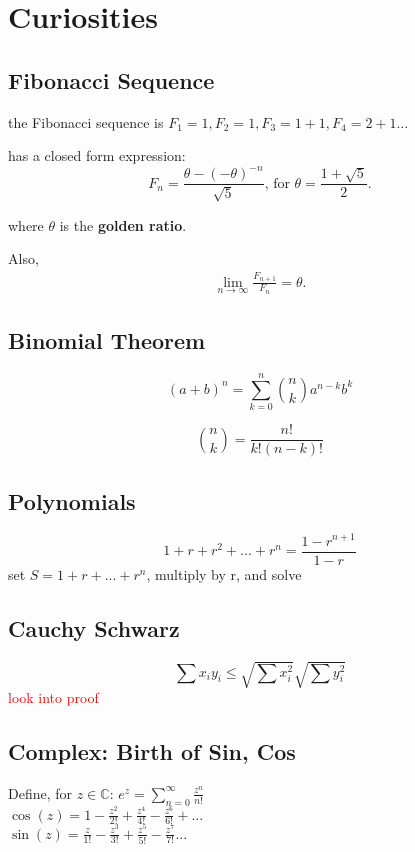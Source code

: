 \documentclass[a4paper, 12pt]{article}
\title{}
\date{}
\newcommand{\bt}[1]{\textbf{#1}} %
\newcommand{\eq}[1]{\begin{align*}#1\end{align*}} %
\renewcommand{\eq}[1]{\begin{align*}#1\end{align*}} %
\begin{document}
\section*{Curiosities}

\subsection*{Fibonacci Sequence}
the Fibonacci sequence is $F_1 = 1, F_2 = 1, F_3 = 1+1, F_4 = 2 + 1 \dots$

has a closed form expression:
$$F_n = \frac{\theta - (-\theta)^{-n}}{\sqrt{5}}
\text{, for $\theta = \frac{1 + \sqrt{5}}{2}$.}$$

where $\theta$ is the \bt{golden ratio}. 

Also, 
\eq{
    \lim_{n \rightarrow \infty} \frac{F_{n+1}}{F_n} = \theta.
}

\subsection*{Binomial Theorem}
$$(a+b)^n = \sum_{k=0}^n \binom{n}{k} a^{n-k}b^k$$

$$\binom{n}{k} = \frac{n!}{k!(n-k)!}$$

\subsection*{Polynomials}

$$1 + r + r^2 + ... + r^n = \frac{1 - r^{n+1}}{1-r}$$
\textcolor[gray]{0.5}{set $S = 1 + r + ... + r^n$, multiply by r, and solve}


\subsection*{Cauchy Schwarz}

$$\sum x_i y_i \leq \sqrt{\sum x_i^2} \sqrt{\sum y_i^2}$$
\textcolor{red}{look into proof}


\subsection*{Complex: Birth of Sin, Cos}
Define, for $z \in \mathbb{C}$: 
$\displaystyle e^z = \sum_{n=0}^\infty \frac{z^n}{n!}$\\
$\displaystyle \cos(z) = 1 - \frac{z^2}{2!} + \frac{z^4}{4!} - \frac{z^6}{6!} + ...$\\
$\displaystyle \sin(z) = \frac{z}{1!} - \frac{z^3}{3!} + \frac{z^5}{5!} - \frac{z^7}{7!} ...$\\
\ \\
\end{document}

